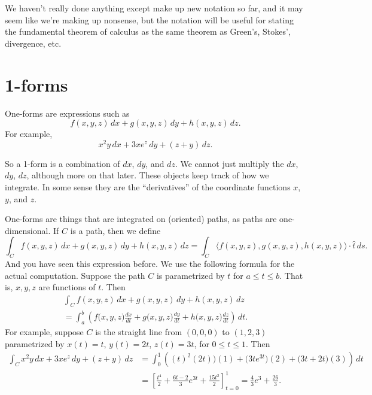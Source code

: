 \documentclass[12pt]{article}
\begin{document}
We haven't really done anything except make up new notation so far, and
it may seem like we're making up nonsense, but the notation will be useful for
stating the fundamental theorem of calculus as the same theorem as 
Green's, Stokes', divergence, etc.

\section*{1-forms}

One-forms are expressions such as
$$
f(x,y,z) \, dx + 
g(x,y,z) \, dy + 
h(x,y,z) \, dz .
$$
For example,
$$
x^2y \, dx + 
3xe^z \, dy + 
(z+y) \, dz .
$$

So a 1-form is a combination of $dx$, $dy$, and $dz$.  We cannot just
multiply the $dx$, $dy$, $dz$, although more on that later.  These objects
keep track of how we integrate.  In some sense they are the ``derivatives''
of the coordinate functions $x$, $y$, and $z$.

One-forms are things that are integrated on (oriented) paths, as paths are
one-dimensional.  If $C$ is a path, then we define 
\begin{equation*}
\int_C
f(x,y,z) \, dx + 
g(x,y,z) \, dy + 
h(x,y,z) \, dz 
=
\int_C
\langle f(x,y,z) , g(x,y,z) , h(x,y,z) \rangle \cdot \hat{t} \, ds .
\end{equation*}
And you have seen this expression before.
We use the following formula for the actual computation.
Suppose the path $C$ is parametrized by $t$
for $a \leq t \leq b$.  That is, $x,y,z$ are functions of $t$.  Then
\begin{multline} \label{eq:oneformev}
\int_C
f(x,y,z) \, dx + 
g(x,y,z) \, dy + 
h(x,y,z) \, dz 
\\
=
\int_a^b 
\left( f\bigl(x,y,z\bigr) \frac{d x}{d t}
+
g\bigl(x,y,z\bigr) \frac{d y}{d t}
+ 
h\bigl(x,y,z\bigr) \frac{d z}{d t}
\right) \, dt.
\end{multline}
For example, suppose $C$ is the straight line from $(0,0,0)$ to $(1,2,3)$
parametrized by $x(t) = t$, $y(t) = 2t$, $z(t) = 3t$, for $0 \leq t \leq 1$.
Then
\begin{equation*}
\begin{split}
\int_C
x^2y \, dx + 
3xe^z \, dy + 
(z+y) \, dz 
& =
\int_0^1 
\left( (t)^2 (2t) \bigr) (1)
+
\bigl(3te^{3t} \bigr) (2)
+ 
\bigl(3t+2t\bigr) (3)
\right) \, dt
\\
& = \left[
\frac{t^4}{2}
+
\frac{6t-2}{3} e^{3t}
+
\frac{15t^2}{2}
\right]_{t=0}^1
=
\frac{4}{3} e^3 + \frac{26}{3} .
\end{split}
\end{equation*}
\end{document}
